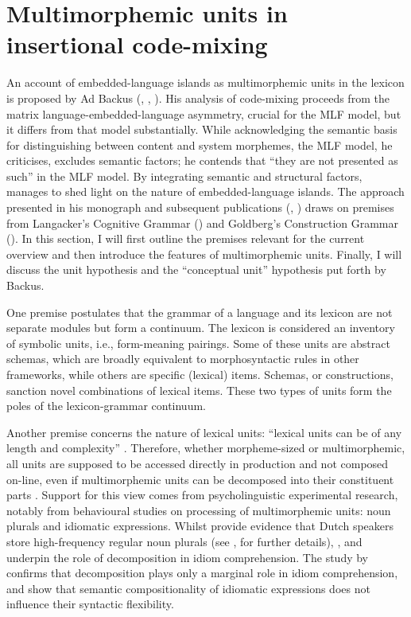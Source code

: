 \section{Multimorphemic units in insertional code-mixing}{\label{unit-hypothesis}}
An account of embedded-language islands as multimorphemic units in the lexicon is proposed by Ad Backus (\citeyear{backus-two-1996}, \citeyear{backus-evidence-1999}, \citeyear{backus-units-2003}). His analysis of code-mixing proceeds from the matrix language-embedded-language asymmetry, crucial for the MLF model, but it differs from that model substantially. While acknowledging the semantic basis for distinguishing between content and system morphemes, the MLF model, he criticises, excludes semantic factors; he contends that ``they are not presented as such'' \citep[115]{backus-two-1996} in the MLF model. By integrating semantic and structural factors, \citet{backus-evidence-1999, backus-units-2003} manages to shed light on the nature of embedded-language islands. The approach presented in his \citeyear{backus-two-1996} monograph and subsequent publications (\citeyear{backus-evidence-1999}, \citeyear{backus-units-2003}) draws on premises from Langacker's Cognitive Grammar (\citeyear{langacker-foundations-1987,langacker-foundations-1991}) and Goldberg's Construction Grammar (\citeyear{goldberg-1995}). In this section, I will first outline the premises relevant for the current overview and then introduce the features of multimorphemic units. Finally, I will discuss the unit hypothesis and the ``conceptual unit'' hypothesis put forth by Backus.

One premise postulates that the grammar of a language and its lexicon are not separate modules but form a continuum. The lexicon is considered an inventory of symbolic units, i.e., form-meaning pairings. Some of these units are abstract schemas, which are broadly equivalent to morphosyntactic rules in other frameworks, while others are specific (lexical) items. Schemas, or constructions, sanction novel combinations of lexical items. These two types of units form the poles of the lexicon-grammar continuum.

Another premise concerns the nature of lexical units: ``lexical units can be of any length and complexity'' \citep[84]{backus-units-2003}. Therefore, whether morpheme-sized or multimorphemic, all units are supposed to be accessed directly in production and not composed on-line, even if multimorphemic units can be decomposed into their constituent parts \citep[cf.][129]{backus-two-1996}. Support for this view comes from psycholinguistic experimental research, notably from behavioural studies on processing of multimorphemic units: noun plurals and idiomatic expressions. Whilst \citet{baayen-dijkstra-schreuder} provide evidence that Dutch speakers store high-frequency regular noun plurals (see , for further details), \citet{libben-multidetermined-2008}, and \citet{tabossi-processing-2008} underpin the role of decomposition in idiom comprehension. The study by \citet{libben-multidetermined-2008} confirms that decomposition plays only a marginal role in idiom comprehension, and \citet{tabossi-processing-2008} show that semantic compositionality of idiomatic expressions does not influence their syntactic flexibility. 

